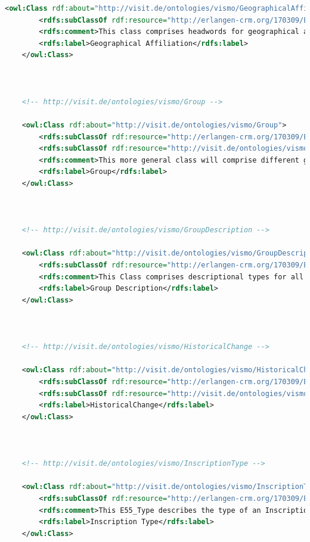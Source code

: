 \begin{lstlisting}[caption={VisMo Ontologie in der letzten (englischen) Version.},label={lst:vismo},captionpos=b,language=xml]
    <owl:Class rdf:about="http://visit.de/ontologies/vismo/GeographicalAffiliation">
        <rdfs:subClassOf rdf:resource="http://erlangen-crm.org/170309/E55_Type"/>
        <rdfs:comment>This class comprises headwords for geographical affiliations for vismo:Architecture resources.</rdfs:comment>
        <rdfs:label>Geographical Affiliation</rdfs:label>
    </owl:Class>
    


    <!-- http://visit.de/ontologies/vismo/Group -->

    <owl:Class rdf:about="http://visit.de/ontologies/vismo/Group">
        <rdfs:subClassOf rdf:resource="http://erlangen-crm.org/170309/E74_Group"/>
        <rdfs:subClassOf rdf:resource="http://visit.de/ontologies/vismo/Resource"/>
        <rdfs:comment>This more general class will comprise different groups of people that are associated in the VisMo context. In the first instance these are WorkingGroups (Werkst\"a tten) and joint practices (Soziet\"a ten).</rdfs:comment>
        <rdfs:label>Group</rdfs:label>
    </owl:Class>
    


    <!-- http://visit.de/ontologies/vismo/GroupDescription -->

    <owl:Class rdf:about="http://visit.de/ontologies/vismo/GroupDescription">
        <rdfs:subClassOf rdf:resource="http://erlangen-crm.org/170309/E55_Type"/>
        <rdfs:comment>This Class comprises descriptional types for all kinds of groups that are associated in the VisMo context, such as Werkstatt and Soziet\"a t.</rdfs:comment>
        <rdfs:label>Group Description</rdfs:label>
    </owl:Class>
    


    <!-- http://visit.de/ontologies/vismo/HistoricalChange -->

    <owl:Class rdf:about="http://visit.de/ontologies/vismo/HistoricalChange">
        <rdfs:subClassOf rdf:resource="http://erlangen-crm.org/170309/E9_Move"/>
        <rdfs:subClassOf rdf:resource="http://visit.de/ontologies/vismo/Resource"/>
        <rdfs:label>HistoricalChange</rdfs:label>
    </owl:Class>
    


    <!-- http://visit.de/ontologies/vismo/InscriptionType -->

    <owl:Class rdf:about="http://visit.de/ontologies/vismo/InscriptionType">
        <rdfs:subClassOf rdf:resource="http://erlangen-crm.org/170309/E55_Type"/>
        <rdfs:comment>This E55_Type describes the type of an Inscription, done on various vismo:Object entities.</rdfs:comment>
        <rdfs:label>Inscription Type</rdfs:label>
    </owl:Class>
    



\end{lstlisting}
